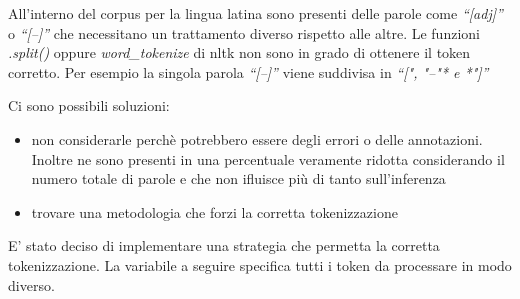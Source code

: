 \documentclass[11pt]{article}
\providecommand{\tightlist}{%
      \setlength{\itemsep}{0pt}\setlength{\parskip}{0pt}}
\begin{document}
    All'interno del corpus per la lingua latina sono presenti delle parole
come \emph{``{[}adj{]}''} o \emph{``{[}--{]}''} che necessitano un
trattamento diverso rispetto alle altre. Le funzioni \emph{.split()}
oppure \emph{word\_tokenize} di nltk non sono in grado di ottenere il
token corretto. Per esempio la singola parola \emph{``{[}--{]}''} viene
suddivisa in \emph{``{[}"\emph{, }"--"* e *"{]}''}

Ci sono possibili soluzioni:

\begin{itemize}
\tightlist
\item
  non considerarle perchè potrebbero essere degli errori o delle
  annotazioni. Inoltre ne sono presenti in una percentuale veramente
  ridotta considerando il numero totale di parole e che non ifluisce più
  di tanto sull'inferenza
\item
  trovare una metodologia che forzi la corretta tokenizzazione
\end{itemize}

E' stato deciso di implementare una strategia che permetta la corretta
tokenizzazione. La variabile a seguire specifica tutti i token da
processare in modo diverso.
\end{document}
